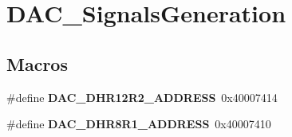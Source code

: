 \hypertarget{group___d_a_c___signals_generation}{\section{D\-A\-C\-\_\-\-Signals\-Generation}
\label{group___d_a_c___signals_generation}
}
\subsection*{Macros}
\begin{DoxyCompactItemize}
\item 
\hypertarget{group___d_a_c___signals_generation_ga84bfc33520316f1fe9ab25de63573086}{\#define {\bfseries D\-A\-C\-\_\-\-D\-H\-R12\-R2\-\_\-\-A\-D\-D\-R\-E\-S\-S}~0x40007414}\label{group___d_a_c___signals_generation_ga84bfc33520316f1fe9ab25de63573086}

\item 
\hypertarget{group___d_a_c___signals_generation_gaf31af6ecca4b1bf7a430102c060fda43}{\#define {\bfseries D\-A\-C\-\_\-\-D\-H\-R8\-R1\-\_\-\-A\-D\-D\-R\-E\-S\-S}~0x40007410}\label{group___d_a_c___signals_generation_gaf31af6ecca4b1bf7a430102c060fda43}

\end{DoxyCompactItemize}
